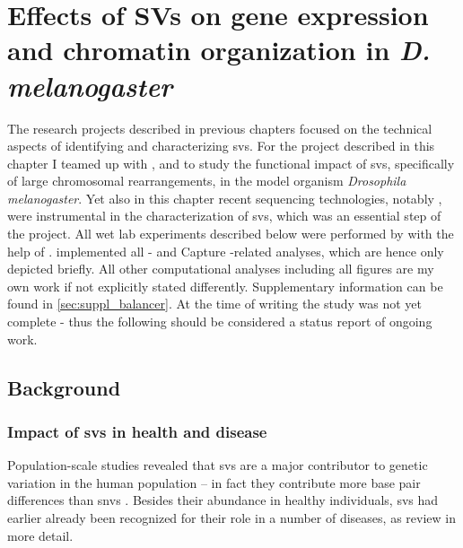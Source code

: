\chapter{Effects of SVs on gene expression and chromatin
organization in \texorpdfstring{\textit{D. melanogaster}}{D. melanogaster}}
\label{sec:balancer}



The research projects described in previous chapters focused on the technical
aspects of identifying and characterizing \acp{sv}. For the project described in
this chapter I teamed up with \yad, \alek and \eileen to study the functional
impact of \acp{sv}, specifically of large chromosomal rearrangements, in the model
organism \textit{Drosophila melanogaster}. Yet also in this chapter recent
sequencing technologies, notably \hic, were instrumental in the characterization
of \acp{sv}, which was an essential step of the project. All wet lab experiments
described below were performed by \yad with the help of \rebecca.
\alek implemented all \hic- and Capture \hic-related analyses, which are hence
only depicted briefly. All other computational analyses including all figures
are my own work if not explicitly stated differently. Supplementary information
can be found in \cref{sec:suppl_balancer}. At the time of writing the study was
not yet complete - thus the following should be considered a status report of
ongoing work.



\section{Background}
\label{sec:balancer_background}


\subsection{Impact of \texorpdfstring{\acp{sv}}{SVs} in health and disease}

Population-scale studies revealed that \acp{sv} are a major contributor to
genetic variation in the human population \citep{Conrad2010} – in fact they
contribute more base pair differences than \acp{snv} \citep{Sudmant2015}.
Besides their abundance in healthy individuals, \acp{sv} had earlier already
been recognized for their role in a number of diseases, as
\citet{Zhang2009,Weischenfeldt2013,Carvalho2016} review in more detail.

